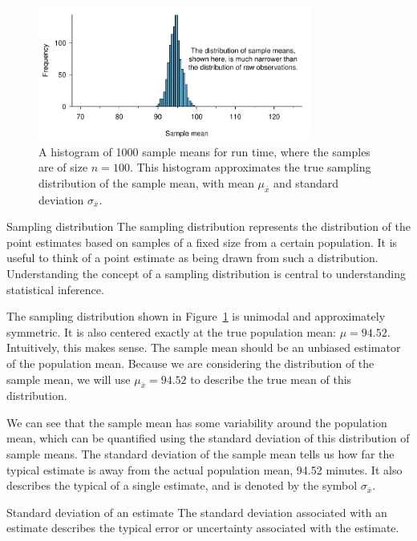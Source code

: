\begin{figure}[h]
   \centering
   \includegraphics[width=0.8\textwidth]{ch_distributions/figures/netTime1000SamplingDistribution/netTime1000SamplingDistribution}
   \caption{A histogram of 1000 sample means for run time, where the samples are of size $n=100$. This histogram approximates the true sampling distribution of the sample mean, with mean $\mu_{\bar{x}}$ and standard deviation $\sigma_{\bar{x}}$.}
   \label{netTime1000SamplingDistribution}
\end{figure}

\begin{onebox}{Sampling distribution}
The sampling distribution represents the distribution of the point estimates based on samples of a fixed size from a certain population. It is useful to think of a point estimate as being drawn from such a distribution. Understanding the concept of a sampling distribution is central to understanding statistical inference.\end{onebox}


The sampling distribution shown in Figure~\ref{netTime1000SamplingDistribution} is unimodal and approximately symmetric. It is also centered exactly at the true population mean: $\mu=94.52$. Intuitively, this makes sense. The sample mean should be an unbiased estimator of the population mean. Because we are considering the distribution of the sample mean, we will use $\mu_{\bar{x}} = 94.52$ to describe the true mean of this distribution.

We can see that the sample mean has some variability around the population mean, which can be quantified using the standard deviation of this distribution of sample means. The standard deviation of the sample mean tells us how far the typical estimate is away from the actual population mean, 94.52 minutes. It also describes the typical  of a single estimate, and is denoted by the symbol $\sigma_{\bar{x}}$. 

\begin{onebox}{Standard deviation of an estimate}
The standard deviation associated with an estimate describes the typical error or uncertainty associated with the estimate.\end{onebox}

